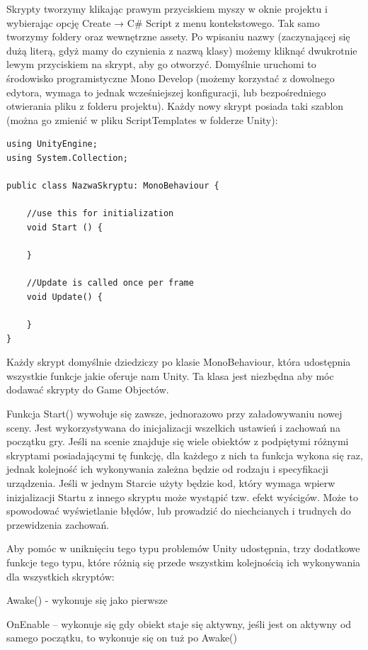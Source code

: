 \documentclass[openright]{xmgr}
\begin{document}
Skrypty tworzymy klikając prawym przyciskiem myszy w oknie projektu i wybierając opcję  Create    → C\# Script z menu kontekstowego. Tak samo tworzymy foldery oraz wewnętrzne assety. Po wpisaniu nazwy (zaczynającej się dużą literą, gdyż mamy do czynienia z nazwą klasy) możemy kliknąć dwukrotnie lewym przyciskiem na skrypt, aby go otworzyć. Domyślnie uruchomi to środowisko programistyczne Mono Develop (możemy korzystać z dowolnego edytora, wymaga to jednak wcześniejszej konfiguracji, lub bezpośredniego otwierania pliku z folderu projektu). Każdy nowy skrypt posiada taki szablon (można go zmienić w pliku ScriptTemplates w folderze Unity):

\newpage
\begin{lstlisting}
using UnityEngine;
using System.Collection;

public class NazwaSkryptu: MonoBehaviour {

	//use this for initialization
	void Start () {

	}

	//Update is called once per frame
	void Update() {

	}
}
\end{lstlisting}

Każdy skrypt domyślnie dziedziczy po klasie MonoBehaviour, która  udostępnia wszystkie funkcje jakie oferuje nam Unity. Ta klasa jest niezbędna aby móc dodawać skrypty do Game Objectów.

Funkcja Start() wywołuje się zawsze, jednorazowo przy załadowywaniu nowej sceny. Jest wykorzystywana do inicjalizacji wszelkich ustawień i zachowań na początku gry. Jeśli na scenie znajduje się wiele obiektów z podpiętymi różnymi skryptami posiadającymi tę funkcję, dla każdego  z nich ta funkcja wykona się raz, jednak kolejność ich wykonywania zależna będzie od rodzaju i specyfikacji urządzenia. Jeśli w jednym Starcie użyty będzie kod, który wymaga wpierw inizjalizacji Startu z innego skryptu może wystąpić tzw. efekt wyścigów. Może to spowodować wyświetlanie błędów, lub prowadzić do niechcianych i trudnych do przewidzenia zachowań.

Aby pomóc w uniknięciu tego typu problemów Unity udostępnia, trzy dodatkowe funkcje tego typu, które różnią się przede wszystkim kolejnością ich wykonywania dla wszystkich skryptów:

Awake() - wykonuje się jako pierwsze

OnEnable – wykonuje się gdy obiekt staje się aktywny, jeśli jest on aktywny od samego początku, to wykonuje się on tuż po Awake()
\end{document}
